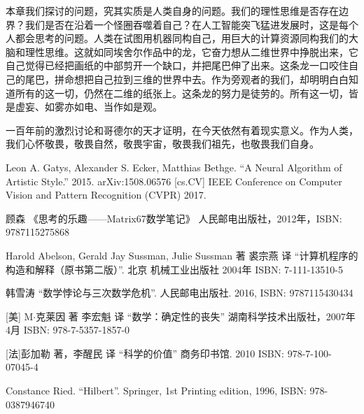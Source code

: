 \documentclass{article}
\begin{document}
本章我们探讨的问题，究其实质是人类自身的问题。我们的理性思维是否存在边界？我们是否在沿着一个怪圈吞噬着自己？在人工智能突飞猛进发展时，这是每个人都会思考的问题。人类在试图用机器同构自己，用巨大的计算资源同构我们的大脑和理性思维。这就如同埃舍尔作品中的龙，它奋力想从二维世界中挣脱出来，它自己觉得已经把画纸的中部剪开一个缺口，并把尾巴伸了出来。这条龙一口咬住自己的尾巴，拼命想把自己拉到三维的世界中去。作为旁观者的我们，却明明白白知道所有的这一切，仍然在二维的纸张上。这条龙的努力是徒劳的。所有这一切，皆是虚妄、如雾亦如电、当作如是观。

一百年前的激烈讨论和哥德尔的天才证明，在今天依然有着现实意义。作为人类，我们心怀敬畏，敬畏自然，敬畏宇宙，敬畏我们祖先，也敬畏我们自身。

\ifx\wholebook\relax \else
\begin{thebibliography}{99}

Leon A. Gatys, Alexander S. Ecker, Matthias Bethge. ``A Neural Algorithm of Artistic Style.'' 2015. arXiv:1508.06576 [cs.CV] IEEE Conference on Computer Vision and Pattern Recognition (CVPR) 2017.

顾森 《思考的乐趣——Matrix67数学笔记》 人民邮电出版社，2012年，ISBN: 9787115275868

Harold Abelson, Gerald Jay Sussman, Julie Sussman 著 裘宗燕 译 ``计算机程序的构造和解释（原书第二版）''. 北京 机械工业出版社 2004年 ISBN: 7-111-13510-5

韩雪涛 ``数学悖论与三次数学危机''. 人民邮电出版社. 2016, ISBN: 9787115430434

[美] M$\cdot$克莱因 著 李宏魁 译 ``数学：确定性的丧失'' 湖南科学技术出版社，2007年4月 ISBN: 978-7-5357-1857-0

[法]彭加勒 著，李醒民 译 ``科学的价值'' 商务印书馆. 2010 ISBN: 978-7-100-07045-4

Constance Ried. ``Hilbert''. Springer, 1st Printing edition, 1996, ISBN: 978-0387946740

\end{thebibliography}

\expandafter\enddocument

\fi
\end{document}
